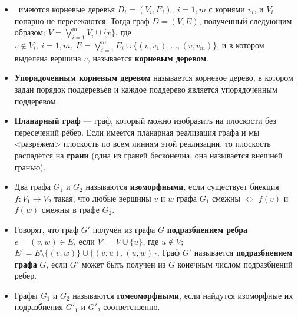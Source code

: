 \begin{itemize}
\item \mathLet \ имеются корневые деревья $D_i = (V_i , E_i),~i = \overline{1,m}$ с корнями $v_i$, и $V_i$ попарно не пересекаются. 
Тогда граф $D = (V, E)$, полученный следующим образом: $V = \bigvee^m_{i=1} V_i \cup \{v\}$, где $v \notin V_i,~i = \overline{1,m},~E = \bigvee^m_{i=1} E_i \cup \{(v, v_1), \dots, (v, v_m)\}$, и в котором выделена вершина $v$, называется \textbf{корневым деревом}.

\item \textbf{Упорядоченным корневым деревом} называется корневое дерево, в котором задан порядок поддеревьев и каждое поддерево является упорядоченным поддеревом.

\item \textbf{Планарный граф} --- граф, который можно изобразить на плоскости без пересечений рёбер.
Если имеется планарная реализация графа и мы <разрежем> плоскость по всем линиям этой реализации, то плоскость распадётся на \textbf{грани} (одна из граней бесконечна, она называется внешней гранью).

\item Два графа $G_1$ и $G_2$ называются \textbf{изоморфными}, если существует биекция $f: V_1 \rightarrow V_2$ такая, что любые вершины $v$ и $w$ графа $G_1$ смежны $\Leftrightarrow$ $f(v)$ и $f(w)$ смежны в графе $G_2$.

\item Говорят, что граф $G'$ получен из графа $G$ \textbf{подразбиением ребра} $e = (v,w) \in E$, если $V' = V \cup \{u\}$, где $u \notin V$; $E' = E \setminus \{(v,w)\} \cup \{(v, u), (u,w)\}$. Граф $G'$ называется \textbf{подразбиением графа} $G$, если $G'$ может быть получен из $G$ конечным числом подразбиений ребер.

\item Графы $G_1$ и $G_2$ называются \textbf{гомеоморфными}, если найдутся изоморфные их подразбиения $G'_1$ и $G'_2$ соответственно.

\end{itemize}

